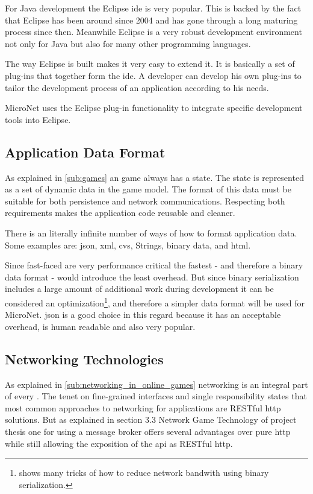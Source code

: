 For Java development the Eclipse \gls{ide} is very popular. This is backed by
the fact that Eclipse has been around since 2004 and has gone through a long
maturing process since then. Meanwhile Eclipse is a very robust development
environment not only for Java but also for many other programming languages.

The way Eclipse is built makes it very easy to extend it. It is basically a set
of plug-ins that together form the \gls{ide}. A developer can develop his own
plug-ins to tailor the development process of an application according to his
needs.

MicroNet uses the Eclipse plug-in functionality to integrate \ms{} specific
development tools into Eclipse.

\subsection{Application Data Format}

As explained in \autoref{sub:games} an \og{} game always has a state. The state
is represented as a set of dynamic data in the game model. The format of this
data must be suitable for both persistence and network communications.
Respecting both requirements makes the application code reusable and cleaner.

There is an literally infinite number of ways of how to format application data.
Some examples are: \gls{json}, \gls{xml}, \gls{cvs}, Strings, binary data, and
\gls{html}.

Since fast-faced \ogs{} are very performance critical the fastest - and
therefore a binary data format - would introduce the least overhead. But since
binary serialization includes a large amount of additional work during
development it can be considered an
optimization\footnote{\cite{gafferon2017games} shows many tricks of how to
reduce \og{} network bandwith using binary serialization.}, and therefore a
simpler data format will be used for MicroNet.
\gls{json} is a good choice in this regard because it has an acceptable
overhead, is human readable and also very popular.

\subsection{Networking Technologies}

As explained in \autoref{sub:networking_in_online_games} networking is an
integral part of every \og{}. The \ms{} tenet on fine-grained interfaces and
single responsibility states that most common approaches to networking for \ms{}
applications are RESTful \gls{http} solutions. But as explained in section 3.3
Network Game Technology of project thesis one \cite{biedermann2015project1} for
\ogs{} using a message broker offers several advantages over pure \gls{http}
while still allowing the exposition of the \gls{api} as RESTful \gls{http}.

